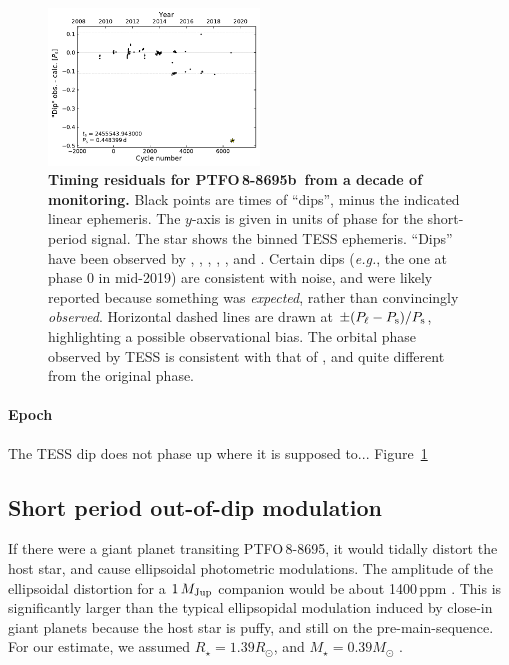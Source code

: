 \documentclass[12pt,twocolumn,tighten]{aastex62}
\newcommand{\ptfo}{PTFO$\,$8-8695}
\newcommand{\ptfob}{PTFO$\,$8-8695b}
\begin{document}
\begin{figure}[t]
	\begin{center}
		\leavevmode
		\includegraphics[width=0.5\textwidth]{f6.pdf}
	\end{center}
	\vspace{-0.7cm}
	\caption{
		{\bf Timing residuals for \ptfob\ from a decade of monitoring.}
    Black points are times of ``dips'', minus the indicated linear
    ephemeris.  The $y$-axis is given in units of phase for the
    short-period signal.  The star shows the binned TESS ephemeris.
    ``Dips'' have been observed by \citet{van_eyken_ptf_2012},
    \citet{ciardi_followup_2015}, \citet{yu_tests_2015},
    \citet{raetz_yeti_2016}, \citet{onitsuka_multicolor_2017}, and
    \citet{tanimoto_evidence_2020}.  Certain dips ({\it e.g.}, the one
    at phase 0 in mid-2019) are consistent with noise, and were likely
    reported because something was {\it expected}, rather than
    convincingly {\it observed}.  Horizontal dashed lines are drawn at
    $\pm (P_{\rm \ell} - P_{\rm s})/P_{\rm s}$, highlighting a
    possible observational bias.  The orbital phase observed by TESS
    is consistent with that of \citet{tanimoto_evidence_2020}, and
    quite different from the original phase.
		\label{fig:o_minus_c}
	}
\end{figure}

\paragraph{Epoch}
The TESS dip does not phase up where it is supposed to...
Figure~\ref{fig:o_minus_c}

\subsection{Short period out-of-dip modulation}
If there were a giant planet transiting \ptfo, it would tidally
distort the host star, and cause ellipsoidal photometric modulations.
The amplitude of the ellipsoidal distortion for a $1\,M_{\rm Jup}$
companion would be about 1400$\,$ppm
\citep{shporer_astrophysics_2017}.  This is significantly larger than
the typical ellipsopidal modulation induced by close-in giant planets
because the host star is puffy, and still on the pre-main-sequence.
For our estimate, we assumed $R_\star = 1.39 R_\odot$, and $M_\star =
0.39 M_\odot$ \citep{van_eyken_ptf_2012}. 
\end{document}
